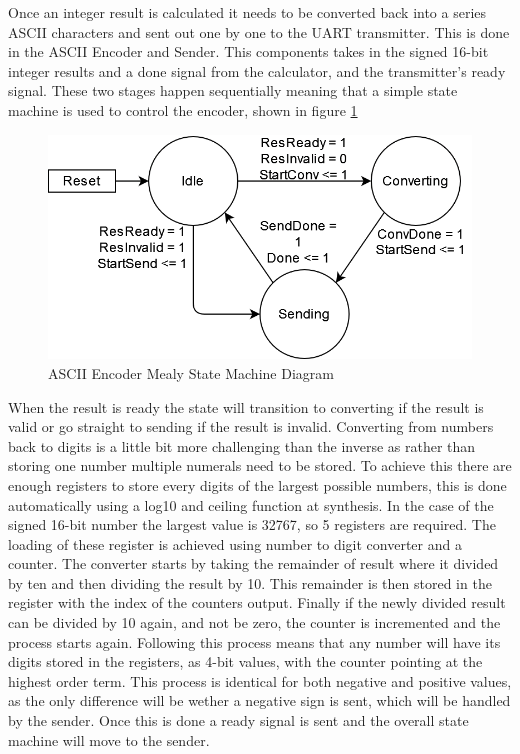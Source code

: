 \documentclass[11pt]{article}
\begin{document}
Once an integer result is calculated it needs to be converted back into a series ASCII characters and sent out one by one to the UART transmitter.
This is done in the ASCII Encoder and Sender.
This components takes in the signed 16-bit integer results and a done signal from the calculator, and the transmitter's ready signal.
These two stages happen sequentially meaning that a simple state machine is used to control the encoder, shown in figure \ref{fig:encodersm}


\begin{figure}[H]        
    \centering
    \includegraphics[width=.66\textwidth]{EncoderSM.drawio.png}
    \caption{ASCII Encoder Mealy State Machine Diagram}
    \label{fig:encodersm}
\end{figure} 

When the result is ready the state will transition to converting if the result is valid or go straight to sending if the result is invalid.
Converting from numbers back to digits is a little bit more challenging than the inverse as rather than storing one number multiple numerals need to be stored.
To achieve this there are enough registers to store every digits of the largest possible numbers,
this is done automatically using a log10 and ceiling function at synthesis.
In the case of the signed 16-bit number the largest value is 32767, so 5 registers are required.
The loading of these register is achieved using number to digit converter and a counter.
The converter starts by taking the remainder of result where it divided by ten and then dividing the result by 10.
This remainder is then stored in the register with the index of the counters output. 
Finally if the newly divided result can be divided by 10 again, and not be zero, the counter is incremented and the process starts again.
Following this process means that any number will have its digits stored in the registers, as 4-bit values, with the counter pointing at the highest order term.
This process is identical for both negative and positive values, as the only difference will be wether a negative sign is sent, which will be handled by the sender.
Once this is done a ready signal is sent and the overall state machine will move to the sender.
\end{document}
